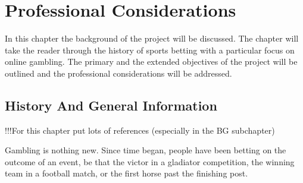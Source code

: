 \chapter{Professional Considerations}
\label{ch:ProfConsiderations}
In this chapter the background of the project will be discussed. The chapter will take the reader through the history of sports betting with a particular focus on online gambling. The primary and the extended objectives of the project will be outlined and the professional considerations will be addressed. 

\section{History And General Information}
\label{sec:history_back}
!!!For this chapter put lots of references (especially in the BG subchapter)

Gambling is nothing new. Since time began, people have been betting on the outcome of an event, be that the victor in a gladiator competition, the winning team in a football match, or the first horse past the finishing post.


